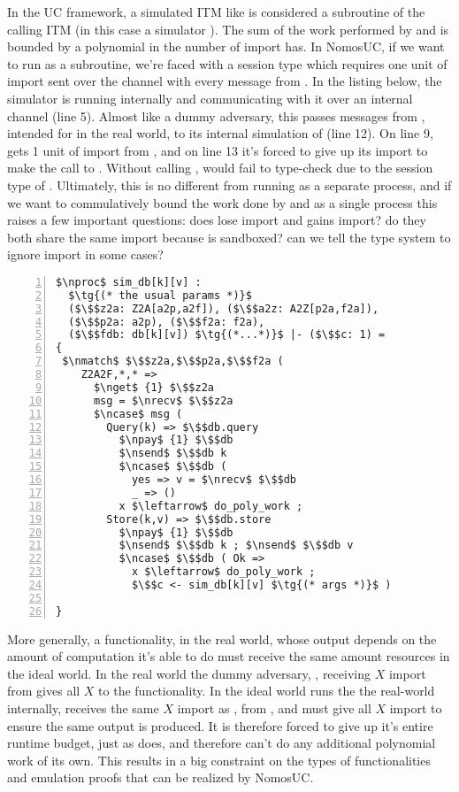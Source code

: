 In the UC framework, a simulated ITM like \Fdb is considered a subroutine of the calling ITM (in this case a simulator \Sim).
The sum of the work performed by \Fdb and \Sim is bounded by a polynomial in the number of import \Sim has.
In NomosUC, if we want to run \Fdb as a subroutine, we're faced with a session type  which requires one unit of import sent over the channel with every message from \Sim.
In the listing below, the simulator is running \Fdb internally and communicating with it over an internal channel  (line 5). 
Almost like a dummy adversary, this \Sim passes messages from \Z, intended for \Fdb in the real world, to its internal simulation of \Fdb (line 12).
On line 9, \Sim gets 1 unit of import from \Z, and on line 13 it's forced to give up its import to make the call to \Fdb.
Without calling \ipay, \Sim would fail to type-check due to the session type of \Fdb.
Ultimately, this is no different from running \Fdb as a separate process, and if we want to commulatively bound the work done by \Fdb and \Sim as a single process this raises a few important questions:
does \Sim lose import and \Fdb gains import? do they both share the same import because \Fdb is sandboxed? can we tell the type system to ignore import in some cases?

\begin{lstlisting}[basicstyle=\scriptsize\BeraMonottFamily, frame=single, mathescape, numbers=left, xleftmargin=2em, xrightmargin=2em]
$\nproc$ sim_db[k][v] : 
  $\tg{(* the usual params *)}$
  ($\$$z2a: Z2A[a2p,a2f]), ($\$$a2z: A2Z[p2a,f2a]),
  ($\$$p2a: a2p), ($\$$f2a: f2a),
  ($\$$fdb: db[k][v]) $\tg{(*...*)}$ |- ($\$$c: 1) =
{
 $\nmatch$ $\$$z2a,$\$$p2a,$\$$f2a (
    Z2A2F,*,* =>
      $\nget$ {1} $\$$z2a
      msg = $\nrecv$ $\$$z2a
      $\ncase$ msg (
        Query(k) => $\$$db.query
          $\npay$ {1} $\$$db
          $\nsend$ $\$$db k
          $\ncase$ $\$$db (
            yes => v = $\nrecv$ $\$$db 
            _ => ()
          x $\leftarrow$ do_poly_work ;
        Store(k,v) => $\$$db.store
          $\npay$ {1} $\$$db
          $\nsend$ $\$$db k ; $\nsend$ $\$$db v
          $\ncase$ $\$$db ( Ok => 
            x $\leftarrow$ do_poly_work ;
            $\$$c <- sim_db[k][v] $\tg{(* args *)}$ )

}
\end{lstlisting}

More generally, a functionality, in the real world, whose output depends on the amount of computation it's able to do must receive the same amount resources in the ideal world.
In the real world the dummy adversary, \DA, receiving $X$ import from \Z gives all $X$ to the functionality.
In the ideal world \Sim runs the the real-world internally, receives the same $X$ import as \DA, from \Z, and must give \Fdb all $X$ import to ensure the same output is produced. 
It is therefore forced to give up it's entire runtime budget, just as \DA does, and therefore can't do any additional polynomial work of its own. 
This results in a big constraint on the types of functionalities and emulation proofs that can be realized by NomosUC.

